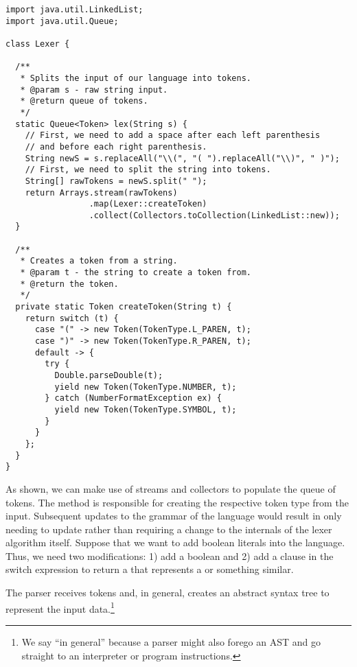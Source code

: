 \begin{lstlisting}[language=MyJava]
import java.util.LinkedList;
import java.util.Queue;

class Lexer {

  /**
   * Splits the input of our language into tokens.
   * @param s - raw string input.
   * @return queue of tokens.
   */
  static Queue<Token> lex(String s) {
    // First, we need to add a space after each left parenthesis 
    // and before each right parenthesis.
    String newS = s.replaceAll("\\(", "( ").replaceAll("\\)", " )");
    // First, we need to split the string into tokens.
    String[] rawTokens = newS.split(" ");
    return Arrays.stream(rawTokens)
                 .map(Lexer::createToken)
                 .collect(Collectors.toCollection(LinkedList::new));
  }

  /**
   * Creates a token from a string.
   * @param t - the string to create a token from.
   * @return the token.
   */
  private static Token createToken(String t) {
    return switch (t) {
      case "(" -> new Token(TokenType.L_PAREN, t);
      case ")" -> new Token(TokenType.R_PAREN, t);
      default -> {
        try {
          Double.parseDouble(t);
          yield new Token(TokenType.NUMBER, t);
        } catch (NumberFormatException ex) {
          yield new Token(TokenType.SYMBOL, t);
        }
      }
    };
  }
}
\end{lstlisting}

As shown, we can make use of streams and collectors to populate the queue of tokens. 
The  method is responsible for creating the respective token type from the input. 
Subsequent updates to the grammar of the language would result in only needing to update  rather than requiring a change to the internals of the lexer algorithm itself. 
Suppose that we want to add boolean literals into the language. Thus, we need two modifications: 1) add a boolean  and 2) add a clause in the switch expression to return a  that represents a  or something similar.

The parser receives tokens and, in general, creates an abstract syntax tree to represent the input data.\footnote{We say ``in general'' because a parser might also forego an AST and go straight to an interpreter or program instructions.}

